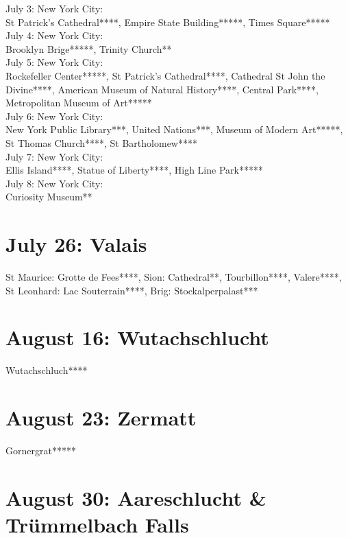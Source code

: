 July 3: New York City:\\
St Patrick's Cathedral****, Empire State Building*****, Times Square*****\\

July 4: New York City:\\
Brooklyn Brige*****, Trinity Church**\\

July 5: New York City:\\
Rockefeller Center*****, St Patrick's Cathedral****, Cathedral St John the Divine****, American Museum of Natural History****, Central Park****, Metropolitan Museum of Art*****\\

July 6: New York City:\\
New York Public Library***, United Nations***, Museum of Modern Art*****, St Thomas Church****, St Bartholomew****\\

July 7: New York City:\\
Ellis Island****, Statue of Liberty****, High Line Park*****\\

July 8: New York City:\\
Curiosity Museum**

\section{July 26: Valais}
\label{2009:Valais}

St Maurice: Grotte de Fees****, Sion: Cathedral**, Tourbillon****, Valere****, St Leonhard: Lac Souterrain****, Brig: Stockalperpalast***

\section{August 16: Wutachschlucht}
\label{2009:Wutachschlucht}

Wutachschluch****

\section{August 23: Zermatt}
\label{2009:Zermatt}

Gornergrat*****

\section{August 30: Aareschlucht \& Tr\"ummelbach Falls}
\label{2009:Aareschlucht}

